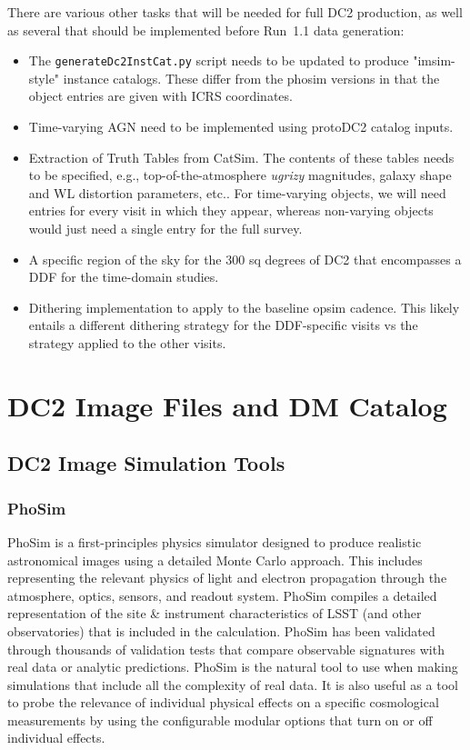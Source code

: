 \documentclass[preprint,times]{aastex61}
\begin{document}
There are various other tasks that will be needed for full DC2 production, as well as several that should be implemented before Run~1.1 data generation:
\begin{itemize}
\item The {\tt generateDc2InstCat.py} script needs to be updated to produce "imsim-style" instance catalogs.  These differ from the phosim versions in that the object entries are given with ICRS coordinates.
\item Time-varying AGN need to be implemented using protoDC2 catalog inputs.
\item Extraction of Truth Tables from CatSim.  The contents of these tables needs to be specified, e.g., top-of-the-atmosphere {\em ugrizy} magnitudes, galaxy shape and WL distortion parameters, etc..  For time-varying objects, we will need entries for every visit in which they appear, whereas non-varying objects would just need a single entry for the full survey.
\item A specific region of the sky for the 300 sq degrees of DC2 that encompasses a DDF for the time-domain studies.
\item Dithering implementation to apply to the baseline opsim cadence. This likely entails a different dithering strategy for the DDF-specific visits vs the strategy applied to the other visits.
\end{itemize}

\section{DC2 Image Files and DM Catalog}

\subsection{DC2 Image Simulation Tools}
\label{sec:imagesims}
\subsubsection{PhoSim}
PhoSim is a first-principles physics simulator designed to produce realistic astronomical images using a detailed Monte Carlo approach.  This includes representing the relevant physics of light and electron propagation through the atmosphere, optics, sensors, and readout system.  PhoSim compiles a detailed representation of the site \& instrument characteristics of LSST (and other observatories) that is included in the calculation.  PhoSim has been validated through thousands of validation tests that compare observable signatures with real data or analytic predictions.  PhoSim is the natural tool to use when making simulations that include all the complexity of real data.  It is also useful as a tool to probe the relevance of individual physical effects on a specific cosmological measurements by using the configurable modular options that turn on or off individual effects.   
\end{document}
